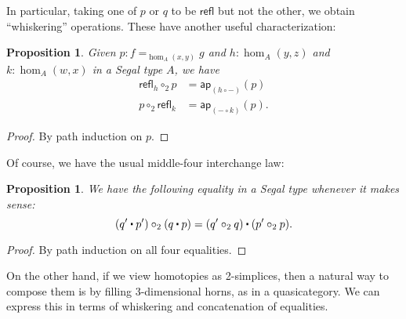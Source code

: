 \documentclass{amsart}
\theoremstyle{plain}
\newtheorem{prop}[thm]{Proposition}
\theoremstyle{definition}
\theoremstyle{remark}
\numberwithin{equation}{section}
\newcommand{\refl}{\mathsf{refl}}
\newcommand{\ct}{%
  \mathchoice{\mathbin{\raisebox{0.5ex}{$\displaystyle\centerdot$}}}%
             {\mathbin{\raisebox{0.5ex}{$\centerdot$}}}%
             {\mathbin{\raisebox{0.25ex}{$\scriptstyle\,\centerdot\,$}}}%
             {\mathbin{\raisebox{0.1ex}{$\scriptscriptstyle\,\centerdot\,$}}}
}
\newcommand{\ap}{\mathsf{ap}}                             %
\begin{document}
In particular, taking one of $p$ or $q$ to be $\refl$ but not the other, we obtain ``whiskering'' operations.
These have another useful characterization:

\begin{prop}
  Given $p:f=_{\hom_A(x,y)} g$ and $h:\hom_A(y,z)$ and $k:\hom_A(w,x)$ in a Segal type $A$, we have
  \begin{align*}
    \refl_h \circ_2 p &= \ap_{(h\circ -)}(p)\\
    p \circ_2 \refl_k &= \ap_{(-\circ k)}(p).
  \end{align*}
\end{prop}
\begin{proof}
  By path induction on $p$.
\end{proof}

Of course, we have the usual middle-four interchange law:

\begin{prop}
  We have the following equality in a Segal type whenever it makes sense:
  \[ (q'\ct p') \circ_2 (q\ct p) = (q' \circ_2 q) \ct (p' \circ_2 p). \]
\end{prop}
\begin{proof}
  By path induction on all four equalities.
\end{proof}

On the other hand, if we view homotopies as 2-simplices, then a natural way to compose them is by filling 3-dimensional horns, as in a quasicategory.
We can express this in terms of whiskering and concatenation of equalities.
\end{document}

